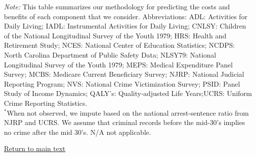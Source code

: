 \documentclass[static]{JJH-Beamer}
\begin{document}
{\flushleft \scriptsize \emph{Note:} This table summarizes our methodology for predicting the costs and benefits of each component that we consider. Abbreviations: ADL: Activities for Daily Living; IADL: Instrumental Activities for Daily Living; CNLSY: Children of the National Longitudinal Survey of the Youth 1979;  HRS: Health and Retirement Study; NCES: National Center of Education Statistics; NCDPS: North Carolina Department of Public Safety Data; NLSY79: National Longitudinal Survey of the Youth 1979; MEPS: Medical Expenditure Panel Survey; MCBS: Medicare Current Beneficiary Survey; NJRP: National Judicial Reporting Program; NVS: National Crime Victimization Survey; PSID: Panel Study of Income Dynamics; QALY's: Quality-adjusted Life Years;UCRS: Uniform Crime Reporting Statistics.\\
$^*$When not observed, we impute based on the national arrest-sentence ratio  from NJRP and UCRS. We assume that criminal records before the mid-30's implies no crime after the mid 30's. N/A not applicable.\\}

\begin{frame}
 \addtocounter{framenumber}{-1}

\begin{center}
\hyperlink{ret:panini}{\underline{Return to main text}}
\end{center}

\end{frame}
\end{document}
